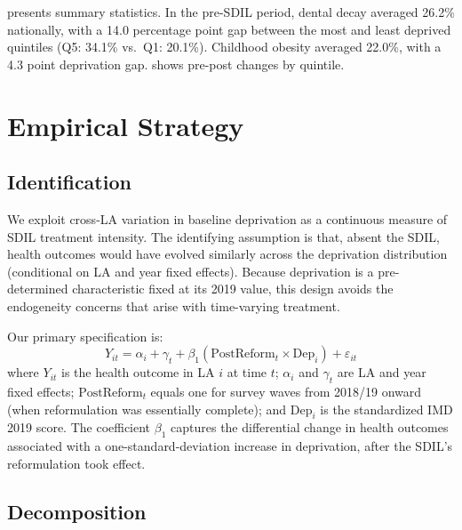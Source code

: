 \documentclass[12pt]{article}
\begin{document}
 presents summary statistics. In the pre-SDIL period, dental decay averaged 26.2\% nationally, with a 14.0 percentage point gap between the most and least deprived quintiles (Q5: 34.1\% vs.\ Q1: 20.1\%). Childhood obesity averaged 22.0\%, with a 4.3 point deprivation gap.  shows pre-post changes by quintile.



\section{Empirical Strategy}
\label{sec:strategy}

\subsection{Identification}

We exploit cross-LA variation in baseline deprivation as a continuous measure of SDIL treatment intensity. The identifying assumption is that, absent the SDIL, health outcomes would have evolved similarly across the deprivation distribution (conditional on LA and year fixed effects). Because deprivation is a pre-determined characteristic fixed at its 2019 value, this design avoids the endogeneity concerns that arise with time-varying treatment.

Our primary specification is:
\begin{equation}
Y_{it} = \alpha_i + \gamma_t + \beta_1 (\text{PostReform}_t \times \text{Dep}_i) + \varepsilon_{it}
\label{eq:main}
\end{equation}
where $Y_{it}$ is the health outcome in LA $i$ at time $t$; $\alpha_i$ and $\gamma_t$ are LA and year fixed effects; $\text{PostReform}_t$ equals one for survey waves from 2018/19 onward (when reformulation was essentially complete); and $\text{Dep}_i$ is the standardized IMD 2019 score. The coefficient $\beta_1$ captures the differential change in health outcomes associated with a one-standard-deviation increase in deprivation, after the SDIL's reformulation took effect.

\subsection{Decomposition}
\end{document}
